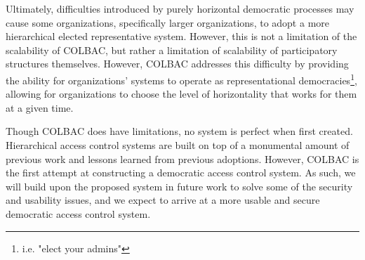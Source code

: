 Ultimately, difficulties introduced by purely horizontal democratic processes
may cause some organizations, specifically larger organizations, to adopt a more
hierarchical elected representative system. However, this is not a limitation of
the scalability of COLBAC, but rather a limitation of scalability of
participatory structures themselves. However, COLBAC addresses this difficulty
by providing the ability for organizations' systems to operate as
representational democracies\footnote{i.e. "elect your admins"}, allowing for
organizations to choose the level of horizontality that works for them at a
given time.

Though COLBAC does have limitations, no system is perfect when first
created. Hierarchical access control systems are built on top of a monumental
amount of previous work and lessons learned from previous adoptions. However,
COLBAC is the first attempt at constructing a democratic access control system.
As such, we will build upon the proposed system in future work to solve some of
the security and usability issues, and we expect to arrive at a more
usable and secure democratic access control system.
